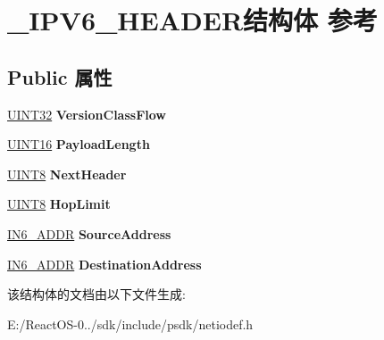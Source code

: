\hypertarget{struct___i_p_v6___h_e_a_d_e_r}{}\section{\+\_\+\+I\+P\+V6\+\_\+\+H\+E\+A\+D\+E\+R结构体 参考}
\label{struct___i_p_v6___h_e_a_d_e_r}
\subsection*{Public 属性}
\begin{DoxyCompactItemize}
\item 
\mbox{\label{struct___i_p_v6___h_e_a_d_e_r_ab205067745e00bc4b8b368ba10482066}} 
\hyperlink{_processor_bind_8h_ae1e6edbbc26d6fbc71a90190d0266018}{U\+I\+N\+T32} {\bfseries Version\+Class\+Flow}
\item 
\mbox{\label{struct___i_p_v6___h_e_a_d_e_r_a7bf04b746c16b58bbc5aa6308d3a9727}} 
\hyperlink{_processor_bind_8h_a09f1a1fb2293e33483cc8d44aefb1eb1}{U\+I\+N\+T16} {\bfseries Payload\+Length}
\item 
\mbox{\label{struct___i_p_v6___h_e_a_d_e_r_a1400c94b69f0d9f720677dc5c415bee7}} 
\hyperlink{_processor_bind_8h_ab27e9918b538ce9d8ca692479b375b6a}{U\+I\+N\+T8} {\bfseries Next\+Header}
\item 
\mbox{\label{struct___i_p_v6___h_e_a_d_e_r_ab8ec9d4bafce592fb12f9cc81a5f6edd}} 
\hyperlink{_processor_bind_8h_ab27e9918b538ce9d8ca692479b375b6a}{U\+I\+N\+T8} {\bfseries Hop\+Limit}
\item 
\mbox{\label{struct___i_p_v6___h_e_a_d_e_r_a014882e3945ddc5f8168a6d0d3e819af}} 
\hyperlink{structin6__addr}{I\+N6\+\_\+\+A\+D\+DR} {\bfseries Source\+Address}
\item 
\mbox{\label{struct___i_p_v6___h_e_a_d_e_r_aaba471ad1c81606da454c6bc52d445dc}} 
\hyperlink{structin6__addr}{I\+N6\+\_\+\+A\+D\+DR} {\bfseries Destination\+Address}
\end{DoxyCompactItemize}


该结构体的文档由以下文件生成\+:\begin{DoxyCompactItemize}
\item 
E\+:/\+React\+O\+S-\/0../sdk/include/psdk/netiodef.\+h\end{DoxyCompactItemize}
